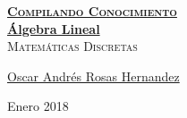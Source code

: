 \documentclass[12pt, fleqn]{report}                             %
\author{Oscar Andrés Rosas}                                     %
\theoremstyle{break}                                            %
\begin{document}
\begin{titlepage}
    
    \pagecolor{TitlePageColor}                                      %
    \color{white}                                                   %

    \vspace                                                         %
    \baselineskip                                                   %

    \makebox[0pt][l]{\rule{1.3\textwidth}{3pt}}                     %
    
    \href{https://compilandoconocimiento.com}                       %
    {\textbf{\textsc{\Huge Compilando Conocimiento}}}\\[2.7cm]      %

    \href{\ProjectNameLink/LibroAlgebraLineal}                      %
    {\fontsize{65}{78}\selectfont \textbf{Álgebra Lineal}}\\[0.5cm] %
    \textcolor{ColorSubtext}{\textsc{\Huge Matemáticas Discretas}}  %
    
    \vfill                                                          %
    
    \href{\ProjectAuthorLink}                                       %
    {\LARGE \textsf{Oscar Andrés Rosas Hernandez}}                  %

    \vspace                                                         %
    \baselineskip                                                   %
    
    {\large \textsf{Enero 2018}}                                    %

\end{titlepage}
\end{document}

